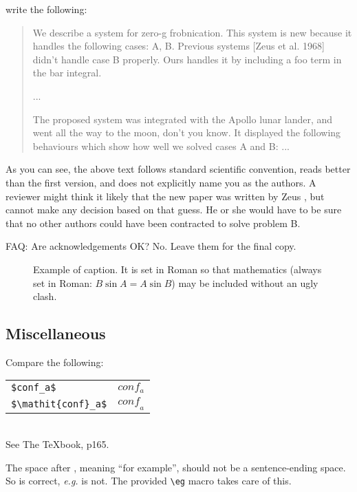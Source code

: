 \documentclass[10pt,twocolumn,letterpaper]{article}
\begin{document}
write the following:
\begin{quotation}
\noindent
   We describe a system for zero-g frobnication.  This
   system is new because it handles the following cases:
   A, B.  Previous systems [Zeus et al. 1968] didn't
   handle case B properly.  Ours handles it by including
   a foo term in the bar integral.

   ...

   The proposed system was integrated with the Apollo
   lunar lander, and went all the way to the moon, don't
   you know.  It displayed the following behaviours
   which show how well we solved cases A and B: ...
\end{quotation}
As you can see, the above text follows standard scientific convention,
reads better than the first version, and does not explicitly name you as
the authors.  A reviewer might think it likely that the new paper was
written by Zeus \etal, but cannot make any decision based on that guess.
He or she would have to be sure that no other authors could have been
contracted to solve problem B.

FAQ: Are acknowledgements OK?  No.  Leave them for the final copy.


\begin{figure}[t]
\begin{center}
\fbox{\rule{0pt}{2in} \rule{0.9\linewidth}{0pt}}
\end{center}
   \caption{Example of caption.  It is set in Roman so that mathematics
   (always set in Roman: $B \sin A = A \sin B$) may be included without an
   ugly clash.}
\label{fig:long}
\label{fig:onecol}
\end{figure}

\subsection{Miscellaneous}

\noindent
Compare the following:\\
\begin{tabular}{ll}
 \verb'$conf_a$' &  $conf_a$ \\
 \verb'$\mathit{conf}_a$' & $\mathit{conf}_a$
\end{tabular}\\
See The \TeX book, p165.

The space after \eg, meaning ``for example'', should not be a
sentence-ending space. So \eg is correct, {\em e.g.} is not.  The provided
\verb'\eg' macro takes care of this.
\end{document}
